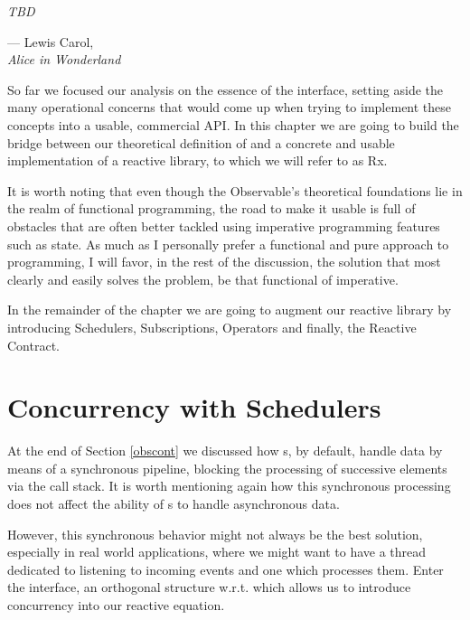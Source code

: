 \let\textcircled=\pgftextcircled
{}
\label{chap:outoftherabbithole}

\epigraph{\hspace{4ex}\textit{TBD}}{--- Lewis Carol,\\ \textit{Alice in Wonderland}}

So far we focused our analysis on the essence of the  interface, setting aside the many operational concerns that would come up when trying to implement these concepts into a usable, commercial API. In this chapter we are going to build the bridge between our theoretical definition of  and a concrete and usable implementation of a reactive library, to which we will refer to as Rx.

It is worth noting that even though the Observable's theoretical foundations lie in the realm of functional programming, the road to make it usable is full of obstacles that are often better tackled using imperative programming features such as state. As much as I personally prefer a functional and pure approach to programming, I will favor, in the rest of the discussion, the solution that most clearly and easily solves the problem, be that functional of imperative.

In the remainder of the chapter we are going to augment our reactive library by introducing Schedulers, Subscriptions, Operators and finally, the Reactive Contract.


\section{Concurrency with Schedulers}

At the end of Section \ref{obscont} we discussed how s, by default, handle data by means of a synchronous pipeline, blocking the processing of successive elements via the call stack. It is worth mentioning again how this synchronous processing does not affect the ability of s to handle asynchronous data.

However, this synchronous behavior might not always be the best solution, especially in real world applications, where we might want to have a thread dedicated to listening to incoming events and one which processes them. Enter the  interface, an orthogonal\cite{wiki:orthogonality} structure w.r.t.  which allows us to introduce concurrency into our reactive equation. 

